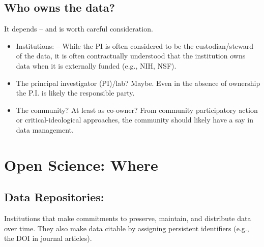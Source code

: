 \documentclass[
  english,
]{book}
\providecommand{\tightlist}{%
  \setlength{\itemsep}{0pt}\setlength{\parskip}{0pt}}
\begin{document}
\hypertarget{who-owns-the-data}{%
\subsection{Who owns the data?}\label{who-owns-the-data}}

It depends -- and is worth careful consideration.

\begin{itemize}
\tightlist
\item
  Institutions:
  -- While the PI is often considered to be the custodian/steward of the data, it is often contractually understood that the institution owns data when it is externally funded (e.g., NIH, NSF).
\item
  The principal investigator (PI)/lab? Maybe. Even in the absence of ownership the P.I. is likely the responsible party.
\item
  The community? At least as co-owner? From community participatory action or critical-ideological approaches, the community should likely have a say in data management.
\end{itemize}

\hypertarget{open-science-where}{%
\section{Open Science: Where}\label{open-science-where}}

\hypertarget{data-repositories}{%
\subsection{Data Repositories:}\label{data-repositories}}

Institutions that make commitments to preserve, maintain, and distribute data over time. They also make data citable by assigning persistent identifiers (e.g., the DOI in journal articles).
\end{document}
